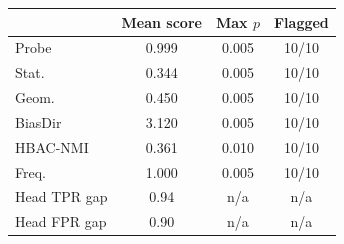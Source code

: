 \begin{tabular}{lccc}
\toprule
 & Mean score & Max $p$ & Flagged \\
\midrule
Probe & 0.999 & 0.005 & 10/10 \\
Stat. & 0.344 & 0.005 & 10/10 \\
Geom. & 0.450 & 0.005 & 10/10 \\
BiasDir & 3.120 & 0.005 & 10/10 \\
HBAC-NMI & 0.361 & 0.010 & 10/10 \\
Freq. & 1.000 & 0.005 & 10/10 \\
\midrule
Head TPR gap & 0.94 & n/a & n/a \\
Head FPR gap & 0.90 & n/a & n/a \\
\bottomrule
\end{tabular}
